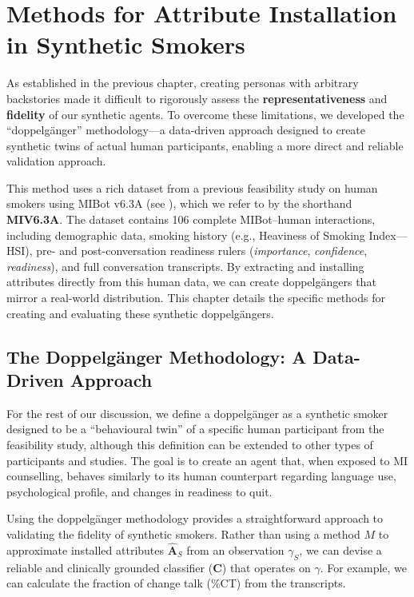 \chapter{Methods for Attribute Installation in Synthetic Smokers}
\label{ch:synthetic-doppelganger}

As established in the previous chapter, creating personas with arbitrary backstories made it difficult to rigorously assess the \textbf{representativeness} and \textbf{fidelity} of our synthetic agents. To overcome these limitations, we developed the ``doppelgänger'' methodology—a data-driven approach designed to create synthetic twins of actual human participants, enabling a more direct and reliable validation approach.

This method uses a rich dataset from a previous feasibility study on human smokers using MIBot v6.3A (see ), which we refer to by the shorthand \textbf{MIV6.3A}. The dataset contains 106 complete MIBot--human interactions, including demographic data, smoking history (e.g., Heaviness of Smoking Index---HSI), pre- and post-conversation readiness rulers (\emph{importance}, \emph{confidence}, \emph{readiness}), and full conversation transcripts. By extracting and installing attributes directly from this human data, we can create doppelgängers that mirror a real-world distribution. This chapter details the specific methods for creating and evaluating these synthetic doppelgängers.

\section{The Doppelgänger Methodology: A Data-Driven Approach}
\label{sec:synthetic-smoker-doppelgänger}

For the rest of our discussion, we define a doppelgänger as a synthetic smoker designed to be a ``behavioural twin'' of a specific human participant from the feasibility study, although this definition can be extended to other types of participants and studies. The goal is to create an agent that, when exposed to MI counselling, behaves similarly to its human counterpart regarding language use, psychological profile, and changes in readiness to quit.

Using the doppelgänger methodology provides a straightforward approach to validating the fidelity of synthetic smokers. Rather than using a method $M$ to approximate installed attributes $\hat{\textbf{A}}_S$ from an observation $\gamma_S$, we can devise a reliable and clinically grounded classifier ($\textbf{C}$) that operates on $\gamma$. For example, we can calculate the fraction of change talk (\%CT) from the transcripts.

